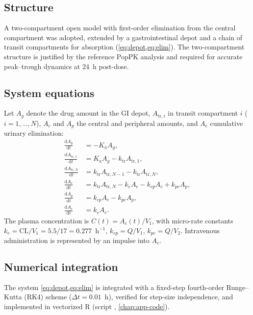 \subsection{Structure}
A two-compartment open model with first-order elimination from the central compartment was adopted, extended by a gastrointestinal depot and a chain of transit compartments for absorption (\cref{eq:depot,eq:elim}). The two-compartment structure is justified by the reference PopPK analysis \citep{Li2021} and required for accurate peak--trough dynamics at 24~h post-dose.

\subsection{System equations}
\label{sec:ode}
Let $A_{g}$ denote the drug amount in the GI depot, $A_{\mathrm{tr},i}$ in transit compartment $i$ ($i=1,\dots,N$), $A_c$ and $A_p$ the central and peripheral amounts, and $A_e$ cumulative urinary elimination:
\begin{align}
\frac{\mathrm{d}A_{g}}{\mathrm{d}t} &= -K_a A_{g}, \label{eq:depot}\\
\frac{\mathrm{d}A_{\mathrm{tr},1}}{\mathrm{d}t} &= K_a A_{g} - k_{\mathrm{tr}} A_{\mathrm{tr},1}, \label{eq:tr1}\\
\frac{\mathrm{d}A_{\mathrm{tr},N}}{\mathrm{d}t} &= k_{\mathrm{tr}} A_{\mathrm{tr},N-1} - k_{\mathrm{tr}} A_{\mathrm{tr},N}, \label{eq:trN}\\
\frac{\mathrm{d}A_{c}}{\mathrm{d}t} &= k_{\mathrm{tr}} A_{\mathrm{tr},N} - k_e A_c - k_{cp} A_c + k_{pc} A_p, \label{eq:central}\\
\frac{\mathrm{d}A_{p}}{\mathrm{d}t} &= k_{cp} A_c - k_{pc} A_p, \label{eq:periph}\\
\frac{\mathrm{d}A_{e}}{\mathrm{d}t} &= k_e A_c. \label{eq:elim}
\end{align}
The plasma concentration is $C(t) = A_c(t)/V_1$, with micro-rate constants $k_e = \mathrm{CL}/V_1 = 5.5/17 = 0.277$~h$^{-1}$, $k_{cp} = Q/V_1$, $k_{pc} = Q/V_2$. Intravenous administration is represented by an impulse into $A_c$.

\subsection{Numerical integration}
The system \cref{eq:depot,eq:elim} is integrated with a fixed-step fourth-order Runge--Kutta (RK4) scheme ($\Delta t = 0.01$~h), verified for step-size independence, and implemented in vectorized R (script , \cref{chap:app-code}).

